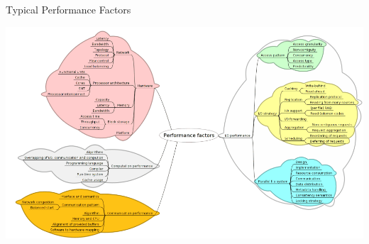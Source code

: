 \documentclass[compress,11pt,xcolor=svgnames,aspectratio=169]{beamer}
\begin{document}

\begin{frame}[fragile]{Typical Performance Factors}

\begin{center}
\includegraphics[scale=0.44]{fig/tree-perf}
\end{center}

\nocite{SOPPOAASLK13}

\end{frame}
\end{document}
